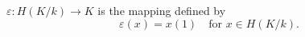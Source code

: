 $\varepsilon: H(K/k) \rightarrow K$ is the mapping defined by
$$\varepsilon(x) = x(1) \quad \text{for } x \in H(K/k).$$
